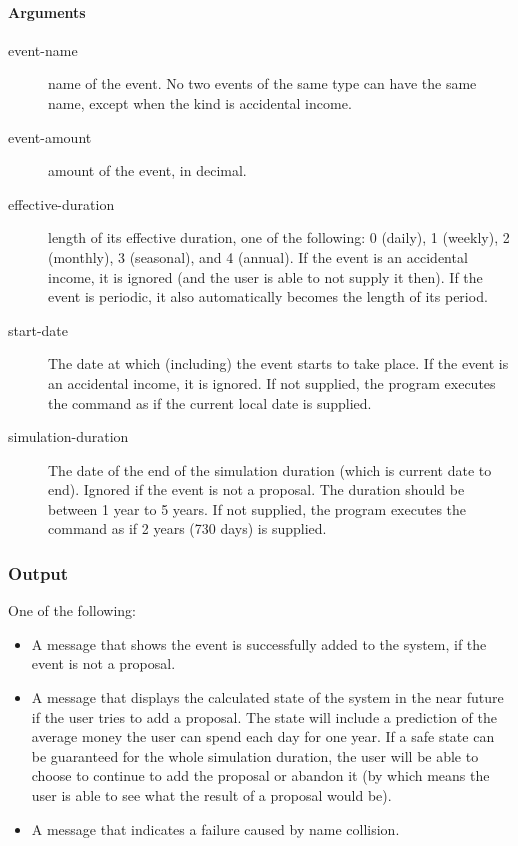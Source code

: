 \paragraph{Arguments}
\begin{description}
	\item[event-name] name of the event. No two events of the same type can have the same name, except when the kind is  accidental income.
	\item[event-amount] amount of the event, in decimal.
	\item[effective-duration] length of its effective duration, one of the following: 0 (daily), 1 (weekly), 2 (monthly), 3 (seasonal), and 4 (annual). If the event is an accidental income, it is ignored (and the user is able to not supply it then). If the event is periodic, it also automatically becomes the length of its period.
	\item[start-date] The date at which (including) the event starts to take place. If the event is an accidental income, it is ignored. If not supplied, the program executes the command as if the current local date is supplied.
	\item[simulation-duration] The date of the end of the simulation duration (which is current date to end). Ignored if the event is not a proposal. The duration should be between 1 year to 5 years. If not supplied, the program executes the command as if 2 years (730 days) is supplied.
\end{description}

\subsubsection{Output}
One of the following:
\begin{itemize}
	\item A message that shows the event is successfully added to the system, if the event is not a proposal.
	\item A message that displays the calculated state of the system in the near future if the user tries to add a proposal. The state will include a prediction of the average money the user can spend each day for one year. If a safe state can be guaranteed for the whole simulation duration, the user will be able to choose to continue to add the proposal or abandon it (by which means the user is able to see what the result of a proposal would be).
	\item A message that indicates a failure caused by name collision.
\end{itemize}

